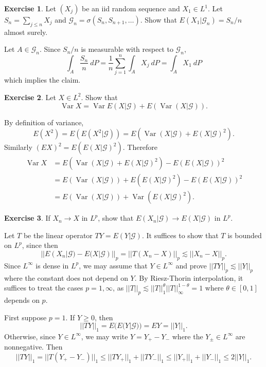 \documentclass[10pt]{article}
\DeclareMathOperator{\Var}{Var}
\theoremstyle{definition}
\newtheorem{exer}{Exercise}
\begin{document}
\begin{exer}
Let $(X_j)$ be an iid random sequence and $X_1 \in L^1$. Let $S_n = \sum_{j \leq n} X_j$ and $\mathcal G_n = \sigma(S_n, S_{n+1}, \dots)$.
Show that $E(X_1|\mathcal G_n) = S_n/n$ almost surely.
\end{exer}

Let $A \in \mathcal G_n$. Since $S_n/n$ is measurable with respect to $\mathcal G_n$,
$$\int_A \frac{S_n}{n} ~dP = \frac{1}{n} \sum_{j=1}^n \int_A X_j ~dP = \int_A X_1 ~dP$$
which implies the claim.

\begin{exer}
Let $X \in L^2$. Show that
$$\Var X = \Var E(X|\mathcal G) + E(\Var(X|\mathcal G)).$$
\end{exer}

By definition of variance,
$$E(X^2) = E(E(X^2|\mathcal G)) = E(\Var(X|\mathcal G) + E(X|\mathcal G)^2).$$
Similarly $(EX)^2 = E(E(X|\mathcal G)^2)$.
Therefore
\begin{align*}\Var X
&= E(\Var(X|\mathcal G) + E(X|\mathcal G)^2) - E(E(X|\mathcal G))^2\\
&= E(\Var(X|\mathcal G)) + E(E(X|\mathcal G)^2) - E(E(X|\mathcal G))^2\\
&= E(\Var(X|\mathcal G)) + \Var(E(X|\mathcal G)^2).
\end{align*}

\begin{exer}
If $X_n \to X$ in $L^p$, show that $E(X_n|\mathcal G) \to E(X|\mathcal G)$ in $L^p$.
\end{exer}

Let $T$ be the linear operator $TY = E(Y|\mathcal G)$.
It suffices to show that $T$ is bounded on $L^p$, since then
$$||E(X_n|\mathcal G) - E(X|\mathcal G)||_p = ||T(X_n - X)||_p \lesssim ||X_n - X||_p.$$
Since $L^\infty$ is dense in $L^p$, we may assume that $Y \in L^\infty$ and prove $||TY||_p \lesssim ||Y||_p$ where the constant does not depend on $Y$.
By Riesz-Thorin interpolation, it suffices to treat the cases $p = 1, \infty$, as $||T||_p \lesssim ||T||_1^\theta ||T||_\infty^{1 - \theta} = 1$ where $\theta \in [0, 1]$ depends on $p$.

First suppose $p = 1$. If $Y \geq 0$, then
$$||TY||_1 = E(E(Y|\mathcal G)) = EY = ||Y||_1.$$
Otherwise, since $Y \in L^\infty$, we may write $Y = Y_+ - Y_-$ where the $Y_\pm \in L^\infty$ are nonnegative. Then
$$||TY||_1 = ||T(Y_+ - Y_-)||_1 \leq ||TY_+||_1 + ||TY_-||_1 \leq ||Y_+||_1 + ||Y_-||_1 \leq 2||Y||_1.$$
\end{document}
